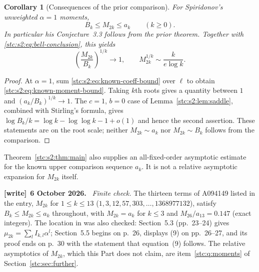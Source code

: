 \documentclass[11pt,letterpaper]{article}
\numberwithin{equation}{section}
\newtheorem{corollary}[theorem]{Corollary}
\theoremstyle{remark}\newtheorem{remark}[theorem]{Remark}
\newenvironment{writenote}[1][]{\par\smallskip\begingroup\small
 \noindent\textbf{[write]}\if\relax\detokenize{#1}\relax\else~\textbf{#1.}\fi\ }%
 {\par\endgroup\smallskip}
\begin{document}
\begin{corollary}[Consequences of the prior comparison]\label{stc:s2:cor:known-moment}
For Spiridonov's unweighted $\alpha=1$ moments,
\begin{equation}\label{stc:s2:eq:known-moment-bound}
 B_k\le M_{2k}\le a_k\qquad(k\ge0).
\end{equation}
In particular his Conjecture~3.3 follows from the prior theorem. Together with \eqref{stc:s2:eq:bell-conclusion}, this yields
\begin{equation}\label{stc:s2:eq:moment-root}
 \left(\frac{M_{2k}}{B_k}\right)^{1/k}\longrightarrow1,
 \qquad M_{2k}^{1/k}\sim\frac{k}{e\log k}.
\end{equation}
\end{corollary}
\begin{proof}
At $\alpha=1$, sum \eqref{stc:s2:eq:known-coeff-bound} over $\ell$ to obtain \eqref{stc:s2:eq:known-moment-bound}. Taking $k$th roots gives a quantity between $1$ and $(a_k/B_k)^{1/k}\to1$. The $c=1$, $b=0$ case of Lemma~\ref{stc:s2:lem:saddle}, combined with Stirling's formula, gives $\log B_k/k=\log k-\log\log k-1+o(1)$ and hence the second assertion. These statements are on the root scale; neither $M_{2k}\sim a_k$ nor $M_{2k}\sim B_k$ follows from the comparison.
\end{proof}
Theorem~\ref{stc:s2:thm:main} also supplies an all-fixed-order asymptotic estimate for the known upper comparison sequence $a_k$. It is not a relative asymptotic expansion for $M_{2k}$ itself.

\begin{writenote}[6 October 2026]
\emph{Finite check.} The thirteen terms of A094149 listed in the entry, $M_{2k}$ for $1\le k\le13$ ($1,3,12,57,303,\ldots,1368977132$), satisfy $B_k\le M_{2k}\le a_k$ throughout, with $M_{2k}=a_k$ for $k\le3$ and $M_{26}/a_{13}=0.147$ (exact integers). The location in \cite{bauer} was also checked: Section~5.3 (pp.~23--24) gives $\mu_{2k}=\sum_lI_{k,l}\alpha^l$; Section~5.5 begins on p.~26, displays (9) on pp.~26--27, and its proof ends on p.~30 with the statement that equation~(9) follows. The relative asymptotics of $M_{2k}$, which this Part does not claim, are item~\ref{stc:q:moments} of Section~\ref{stc:sec:further}.
\end{writenote}
\end{document}
